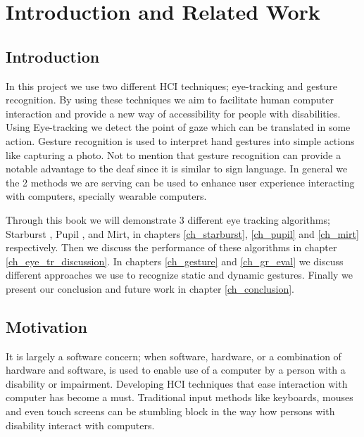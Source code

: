 \chapter{Introduction and Related Work}
\label{ch_intro}
\section{Introduction} 
In this project we use two different HCI techniques; eye-tracking and gesture recognition. By using these techniques we aim to facilitate human computer interaction and provide a new way of accessibility for people with disabilities. Using Eye-tracking we detect the point of gaze which can be translated in some action. Gesture recognition is used to interpret hand gestures into simple actions like   capturing a photo. Not to mention that gesture recognition can provide a notable advantage to the deaf since it is similar to sign language. In general we the 2 methods we are serving can be used to enhance user experience interacting with computers, specially wearable computers. \bigskip

Through this book we will demonstrate 3 different eye tracking algorithms; Starburst \cite{starburst}, Pupil \cite{pupil}, and Mirt, in chapters \ref{ch_starburst}, \ref{ch_pupil} and \ref{ch_mirt} respectively. Then we discuss the performance of these algorithms in chapter \ref{ch_eye_tr_discussion}. In chapters \ref{ch_gesture} and \ref{ch_gr_eval} we discuss different approaches we use to recognize static and dynamic gestures. Finally we present our conclusion and future work in chapter \ref{ch_conclusion}.


\section{Motivation} 
It is largely a software concern; when software, hardware, or a combination of hardware and software, is used to enable use of a computer by a person with a disability or impairment. Developing HCI techniques that ease interaction with computer has become a must. Traditional input methods like keyboards, mouses and even touch screens can be stumbling block in the way how persons with disability interact with computers. \bigskip

